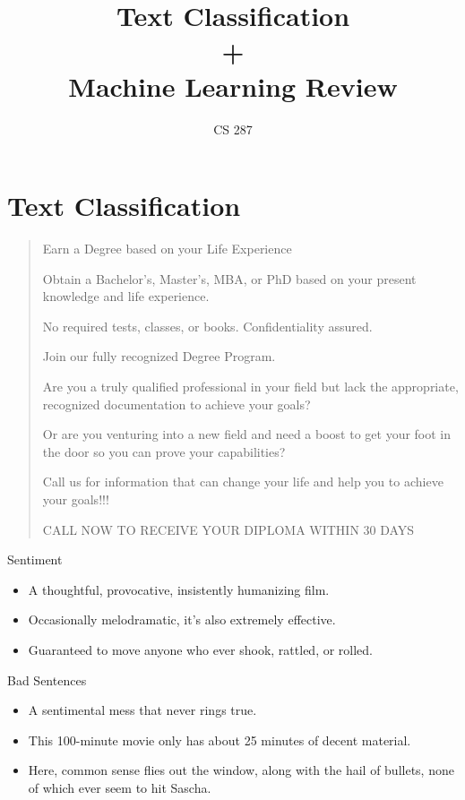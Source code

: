 \documentclass{beamer}
\title{Text Classification\\ + \\ Machine Learning Review }
\date{}
\author{CS 287}
\begin{document}
\begin{frame}
  \titlepage
\end{frame}

\section{Text Classification }

\begin{frame}
\begin{quote}
   Earn a Degree based on your Life Experience

  Obtain a Bachelor's, Master's, MBA, or PhD based on your present
    knowledge and life experience.

    No required tests, classes, or books. Confidentiality assured.

    Join our fully recognized Degree Program.

    Are you a truly qualified professional in your field but lack the
    appropriate, recognized documentation to achieve your goals?

    Or are you venturing into a new field and need a boost to get your
    foot in the door so you can prove your capabilities?

    Call us for information that can change your life and help you to
    achieve your goals!!!

    CALL NOW TO RECEIVE YOUR DIPLOMA WITHIN 30 DAYS
\end{quote}
\end{frame}


\begin{frame}{Sentiment}
  \begin{itemize}
  \item   A thoughtful, provocative, insistently humanizing film. 
  \item   Occasionally melodramatic, it's also extremely effective.
    \item   Guaranteed to move anyone who ever shook, rattled, or rolled.   
  \end{itemize}

  \alert{Bad Sentences}
  \begin{itemize}
  \item A sentimental mess that never rings true.  
  \item This 100-minute movie only has about 25 minutes of decent material.
  \item Here, common sense flies out the window, along with the hail of
    bullets, none of which ever seem to hit Sascha.
  \end{itemize}
\end{frame}
\end{document}
